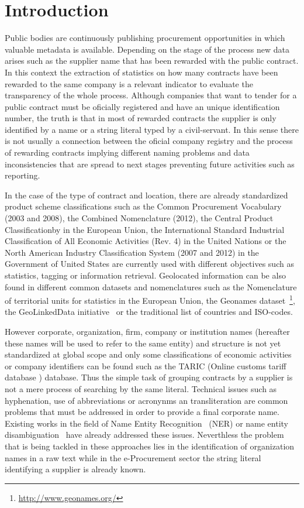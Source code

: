 \documentclass{llncs}
\begin{document}
\section{Introduction}
Public bodies are continuously publishing procurement opportunities in which 
valuable metadata is available. Depending on the stage of the process new data arises such 
as the supplier name that has been rewarded with the public contract. In this 
context the extraction of statistics on how many contracts have been 
rewarded to the same company is a relevant indicator to evaluate the transparency 
of the whole process. Although companies that want to tender for a public contract must be 
oficially registered and have an unique identification number, the truth is 
that in most of rewarded contracts the supplier is only identified by a name or a string literal typed 
by a civil-servant. In this sense there is not usually a connection between 
the oficial company registry and the process of rewarding contracts implying different 
naming problems and data inconsistencies that are spread to next stages preventing future 
activities such as reporting.

In the case of the type of contract and location, there are already standardized~\cite{DBLP:journals/ijseke/AlvarezLSASL12} product 
scheme classifications such as the Common Procurement Vocabulary (2003 and 2008), the Combined Nomenclature (2012), 
the Central Product Classificationby in the European Union, the International Standard Industrial Classification of 
All Economic Activities (Rev. 4) in the United Nations or the North American Industry Classification System (2007 and 2012) 
in the Government of United States are currently used with different objectives such as statistics, tagging or 
information retrieval. Geolocated information can be also found in different common datasets and nomenclatures such as 
the Nomenclature of territorial units for statistics in the European Union, the Geonames dataset~\footnote{\url{http://www.geonames.org/}}, the GeoLinkedData 
initiative~\cite{DBLP:conf/dexa/Lopez-PellicerSCZM10} or the traditional list of countries and ISO-codes.

However corporate, organization, firm, company or institution names (hereafter these names will be used to refer to 
the same entity) and structure is not yet standardized at global scope and only some classifications of economic activities or 
company identifiers can be found such as the TARIC (Online customs tariff database ) database. Thus the simple task of grouping contracts by a supplier is not a mere process of 
searching by the same literal. Technical issues such as hyphenation, use of abbreviations or acronynms an transliteration are common problems that must be addressed in order 
to provide a final corporate name. Existing works in the field of Name Entity Recognition~\cite{citeulike:1657521} (NER) or 
name entity disambiguation~\cite{Sarmento:2009:AWN:1602022.1602085,Klein:2003:NER:1119176.1119204} have already addressed these issues. 
Neverthless the problem that is being tackled in these approaches lies in the identification of organization names in 
a raw text while in the e-Procurement sector the string literal identifying a supplier is already known.
\end{document}
